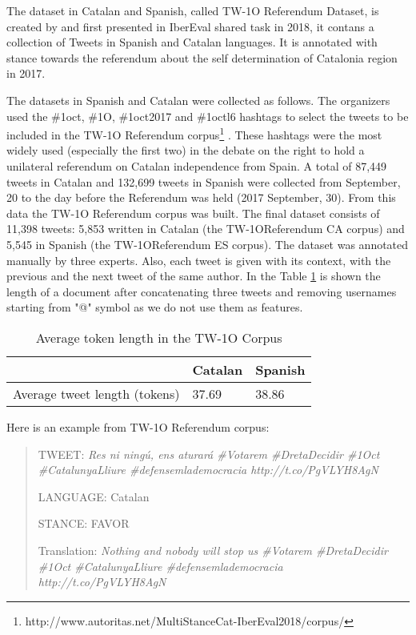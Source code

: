 \documentclass[10pt, a4paper]{article}
\begin{document}
The dataset in Catalan and Spanish, called TW-1O Referendum Dataset, is created by \cite{taule18} and first presented in IberEval shared task in 2018, it contans a collection of Tweets in Spanish and Catalan languages. It is annotated with stance towards the referendum about the self determination of Catalonia region in 2017. 

The datasets in Spanish and Catalan were collected as follows. The organizers used the \#1oct, \#1O, \#1oct2017 and \#1octl6 hashtags to select the tweets to be included in the TW-1O Referendum corpus\footnote{http://www.autoritas.net/MultiStanceCat-IberEval2018/corpus/} \cite{taule18}. These hashtags were the most widely used (especially the first two) in the debate on the right to hold a unilateral referendum on Catalan independence from Spain. A total of 87,449 tweets in Catalan and 132,699 tweets in Spanish were collected from September, 20 to the day before the Referendum was held (2017 September, 30). From this data the TW-1O Referendum corpus was built. The final dataset consists of 11,398 tweets: 5,853 written in Catalan (the TW-1OReferendum CA corpus) and 5,545 in Spanish (the TW-1OReferendum ES corpus). The dataset was annotated manually by three experts. Also, each tweet is given with its context, with the previous and the next tweet of the same author. In the Table \ref{tab:length_tw_dataset} is shown the length of a document after concatenating three tweets and removing usernames starting from "@" symbol as we do not use them as features.

\begin{table}[!h]
\begin{center}
\begin{tabularx}{\columnwidth}{|l|l|X|}

      \hline
        &Catalan&Spanish\\
      \hline
        Average tweet length (tokens) & 37.69 & 38.86\\
      \hline


\end{tabularx}
\caption{Average token length in the TW-1O Corpus}
 \end{center}
 \label{tab:length_tw_dataset}
\end{table}


Here is an example from TW-1O Referendum corpus: 

\begin{quote}
TWEET: \textit{Res ni ning\'u, ens aturar\'a \#Votarem \#DretaDecidir \#1Oct \#CatalunyaLliure \#defensemlademocracia http://t.co/PgVLYH8AgN }

LANGUAGE: Catalan 

STANCE: FAVOR

Translation: \textit{Nothing and nobody will stop us \#Votarem \#DretaDecidir \#1Oct \#CatalunyaLliure \#defensemlademocracia http://t.co/PgVLYH8AgN}
\end{quote}
\end{document}
